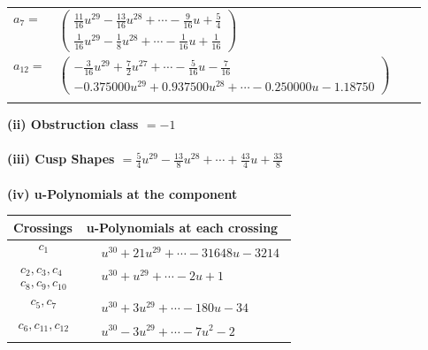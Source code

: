 \documentclass[1p]{elsarticle_modified}
\theoremstyle{definition}
\begin{document}
\begin{tabular}{m{7pt} m{180pt} m{7pt} m{180pt} }
\flushright $a_{7}=$&$\begin{pmatrix}\frac{11}{16} u^{29}-\frac{13}{16} u^{28}+\cdots-\frac{9}{16} u+\frac{5}{4}\\\frac{1}{16} u^{29}-\frac{1}{8} u^{28}+\cdots-\frac{1}{16} u+\frac{1}{16}\end{pmatrix}$ \\
\flushright $a_{12}=$&$\begin{pmatrix}-\frac{3}{16} u^{29}+\frac{7}{2} u^{27}+\cdots-\frac{5}{16} u-\frac{7}{16}\\-0.375000 u^{29}+0.937500 u^{28}+\cdots-0.250000 u-1.18750\end{pmatrix}$\\&\end{tabular}
\flushleft \textbf{(ii) Obstruction class $= -1$}\\~\\
\flushleft \textbf{(iii) Cusp Shapes $= \frac{5}{4} u^{29}-\frac{13}{8} u^{28}+\cdots+\frac{43}{4} u+\frac{33}{8}$}\\~\\
\newpage\renewcommand{\arraystretch}{1}
\flushleft \textbf{(iv) u-Polynomials at the component}\newline \\
\begin{tabular}{m{50pt}|m{274pt}}
Crossings & \hspace{64pt}u-Polynomials at each crossing \\
\hline $$\begin{aligned}c_{1}\end{aligned}$$&$\begin{aligned}
&u^{30}+21 u^{29}+\cdots-31648 u-3214
\end{aligned}$\\
\hline $$\begin{aligned}c_{2},c_{3},c_{4}\\c_{8},c_{9},c_{10}\end{aligned}$$&$\begin{aligned}
&u^{30}+u^{29}+\cdots-2 u+1
\end{aligned}$\\
\hline $$\begin{aligned}c_{5},c_{7}\end{aligned}$$&$\begin{aligned}
&u^{30}+3 u^{29}+\cdots-180 u-34
\end{aligned}$\\
\hline $$\begin{aligned}c_{6},c_{11},c_{12}\end{aligned}$$&$\begin{aligned}
&u^{30}-3 u^{29}+\cdots-7 u^2-2
\end{aligned}$\\
\hline
\end{tabular}\\~\\
\end{document}
